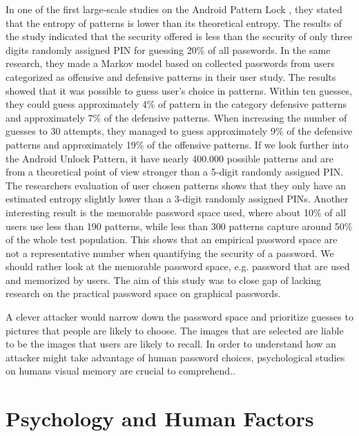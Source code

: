   In one of the first large-scale studies on the Android Pattern Lock \cite{Uellenbeck}, they stated that the entropy of patterns is lower than its theoretical entropy. The results of the study indicated that the security offered is less than the security of only three digits randomly assigned PIN for guessing 20\% of all passwords. In the same research, they made a Markov model based on collected passwords from users categorized as offensive and defensive patterns in their user study. The results showed that it was possible to guess user's choice in patterns. Within ten guesses, they could guess approximately 4\% of pattern in the category defensive patterns and approximately 7\% of the defensive patterns. When increasing the number of guesses to 30 attempts, they managed to guess approximately 9\% of the defensive patterns and approximately 19\% of the offensive patterns. If we look further into the Android Unlock Pattern, it have nearly 400.000 possible patterns and are from a theoretical point of view stronger than a 5-digit randomly assigned PIN. The researchers evaluation of user chosen patterns shows that they only have an estimated entropy slightly lower than a 3-digit randomly assigned PINs. Another interesting result is the memorable password space used, where about 10\% of all users use less than 190 patterns, while less than 300 patterns capture around 50\% of the whole test population. This shows that an empirical password space are not a representative number when quantifying the security of a password. We should rather look at the memorable password space, e.g. password that are used and memorized by users. The aim of this study was to close gap of lacking research on the practical password space on graphical passwords.

  A clever attacker would narrow down the password space and prioritize guesses to pictures that people are likely to choose. The images that are selected are liable to be the images that users are likely to recall. In order to understand how an attacker might take advantage of human password choices, psychological studies on humans visual memory are crucial to comprehend.. 

\clearpage
\section{Psychology and Human Factors} \label{sec:humanfactors}

